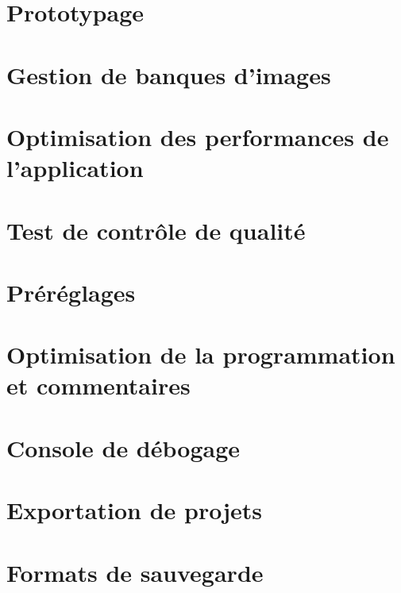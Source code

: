 \documentclass[
]{book}
\begin{document}
\hypertarget{prototypage}{%
\section{Prototypage}\label{prototypage}}

\hypertarget{gestion-de-banques-dimages}{%
\section{Gestion de banques d'images}\label{gestion-de-banques-dimages}}

\hypertarget{optimisation-des-performances-de-lapplication}{%
\section{Optimisation des performances de l'application}\label{optimisation-des-performances-de-lapplication}}

\hypertarget{test-de-contruxf4le-de-qualituxe9}{%
\section{Test de contrôle de qualité}\label{test-de-contruxf4le-de-qualituxe9}}

\hypertarget{pruxe9ruxe9glages}{%
\section{Préréglages}\label{pruxe9ruxe9glages}}

\hypertarget{optimisation-de-la-programmation-et-commentaires}{%
\section{Optimisation de la programmation et commentaires}\label{optimisation-de-la-programmation-et-commentaires}}

\hypertarget{console-de-duxe9bogage}{%
\section{Console de débogage}\label{console-de-duxe9bogage}}

\hypertarget{exportation-de-projets}{%
\section{Exportation de projets}\label{exportation-de-projets}}

\hypertarget{formats-de-sauvegarde}{%
\section{Formats de sauvegarde}\label{formats-de-sauvegarde}}
\end{document}
